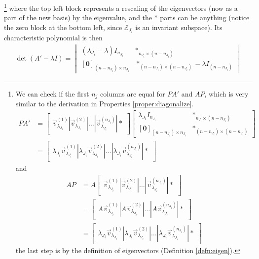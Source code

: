 \footnote{We can check if the first $n_j$ columns are equal for $PA'$ and $AP$, which is very similar to the derivation in Properties \ref{proper:diagonalize}.
\begin{align*}
PA' &= \begin{bmatrix}
\vec{v}_{\lambda_{J_i}}^{(1)}|\vec{v}_{\lambda_{J_i}}^{(2)}|\ldots|\vec{v}_{\lambda_{J_i}}^{(n_{J_i})}|*
\end{bmatrix}
\begin{bmatrix}
\lambda_{J_i} I_{n_{J_i}} & *_{n_{J_i}\times(n-n_{J_i})} \\
[\textbf{0}]_{(n-n_{J_i})\times n_{J_i}} & *_{(n-n_{J_i})\times(n-n_{J_i})}
\end{bmatrix} \\
&=
\begin{bmatrix}
\lambda_{J_i}\vec{v}_{\lambda_{J_i}}^{(1)}|\lambda_{J_i}\vec{v}_{\lambda_{J_i}}^{(2)}|\ldots|\lambda_{J_i}\vec{v}_{\lambda_{J_i}}^{(n_{J_i})}|*
\end{bmatrix}
\end{align*} and
\begin{align*}
AP &= A\begin{bmatrix}
\vec{v}_{\lambda_{J_i}}^{(1)}|\vec{v}_{\lambda_{J_i}}^{(2)}|\ldots|\vec{v}_{\lambda_{J_i}}^{(n_{J_i})}|*
\end{bmatrix} \\
&= 
\begin{bmatrix}
A\vec{v}_{\lambda_{J_i}}^{(1)}|A\vec{v}_{\lambda_{J_i}}^{(2)}|\ldots|A\vec{v}_{\lambda_{J_i}}^{(n_{J_i})}|*
\end{bmatrix} \\
&= \begin{bmatrix}
\lambda_{J_i}\vec{v}_{\lambda_{J_i}}^{(1)}|\lambda_{J_i}\vec{v}_{\lambda_{J_i}}^{(2)}|\ldots|\lambda_{J_i}\vec{v}_{\lambda_{J_i}}^{(n_{J_i})}|*
\end{bmatrix}
\end{align*}
the last step is by the definition of eigenvectors (Definition \ref{defn:eigen}).} 
where the top left block represents a rescaling of the eigenvectors (now as a part of the new basis) by the eigenvalue, and the $*$ parts can be anything (notice the zero block at the bottom left, since $\mathcal{E}_{J_i}$ is an invariant subspace). Its characteristic polynomial is then 
\begin{align*}
\det(A'-\lambda I) =
\begin{vmatrix}
(\lambda_{J_i}-\lambda) I_{n_{J_i}} & *_{n_{J_i}\times(n-n_{J_i})} \\
[\textbf{0}]_{(n-n_{J_i})\times n_{J_i}} & *_{(n-n_{J_i})\times(n-n_{J_i})}-\lambda I_{(n-n_{J_i})}    
\end{vmatrix}
\end{align*}

